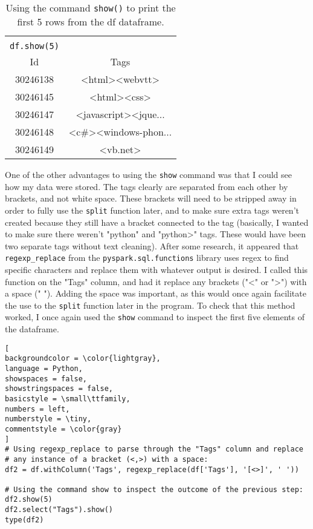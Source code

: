 \documentclass[]{article}
\newcommand{\code}[1]{\colorbox{light-gray}{\texttt{#1}}}
\begin{document}
\begin{table}[!ht]
	\begin{center}
		\caption{Using the command \code{show()} to print the first 5 rows from the df dataframe.}
		\label{tab:table1}
		\begin{tabular}{|cc|} 
			\hline
			&\\
			\code{df.show(5)}&\\
			\hline
			Id  & Tags\\
			\hline
			30246138&<html><webvtt>\\
			30246145&  <html><css>\\
			30246147&<javascript><jque...\\
			30246148&<c\#><windows-phon...\\
			30246149&  <vb.net>\\

			
			\hline
		\end{tabular}
	\end{center}
\end{table}
One of the other advantages to using the \code{show} command was that I could see how my data were stored.  The tags clearly are separated from each other by brackets, and not white space.  These brackets will need to be stripped away in order to fully use the \code{split} function later, and to make sure extra tags weren't created because they still have a bracket connected to the tag (basically, I wanted to make sure there weren't "python" and "python>" tags.  These would have been two separate tags without text cleaning).  After some research, it appeared that \code{regexp\_replace} from the \code{pyspark.sql.functions} library uses regex to find specific characters and replace them with whatever output is desired.  I called this function on the "Tags" column, and had it replace any brackets ("<" or ">") with a space (" ").  Adding the space was important, as this would once again facilitate the use to the \code{split} function later in the program.  To check that this method worked, I once again used the \code{show} command to inspect the first five elements of the dataframe. 
\begin{lstlisting}[
backgroundcolor = \color{lightgray},
language = Python,
showspaces = false,
showstringspaces = false,
basicstyle = \small\ttfamily,
numbers = left,
numberstyle = \tiny,
commentstyle = \color{gray}
]
# Using regexp_replace to parse through the "Tags" column and replace
# any instance of a bracket (<,>) with a space:
df2 = df.withColumn('Tags', regexp_replace(df['Tags'], '[<>]', ' '))

# Using the command show to inspect the outcome of the previous step:
df2.show(5)
df2.select("Tags").show()
type(df2)
\end{lstlisting}
\end{document}
